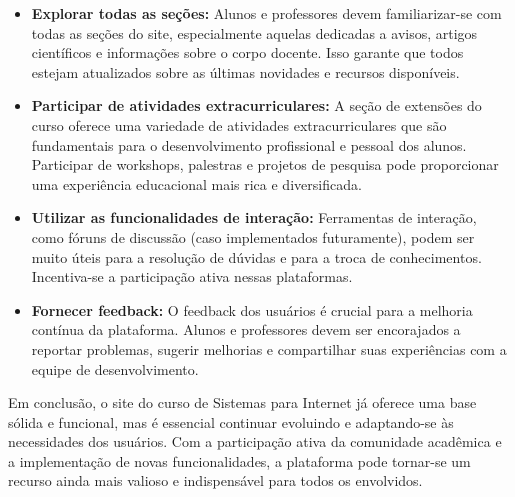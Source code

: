 \documentclass[a4paper,12pt]{report}
\begin{document}
\begin{itemize} 
    \item \textbf{Explorar todas as seções:} Alunos e professores devem familiarizar-se com todas as seções do site, especialmente aquelas dedicadas a avisos, artigos científicos e informações sobre o corpo docente. Isso garante que todos estejam atualizados sobre as últimas novidades e recursos disponíveis. 

    \item \textbf{Participar de atividades extracurriculares:} A seção de extensões do curso oferece uma variedade de atividades extracurriculares que são fundamentais para o desenvolvimento profissional e pessoal dos alunos. Participar de workshops, palestras e projetos de pesquisa pode proporcionar uma experiência educacional mais rica e diversificada. 

    \item \textbf{Utilizar as funcionalidades de interação:} Ferramentas de interação, como fóruns de discussão (caso implementados futuramente), podem ser muito úteis para a resolução de dúvidas e para a troca de conhecimentos. Incentiva-se a participação ativa nessas plataformas. 

    \item \textbf{Fornecer feedback:} O feedback dos usuários é crucial para a melhoria contínua da plataforma. Alunos e professores devem ser encorajados a reportar problemas, sugerir melhorias e compartilhar suas experiências com a equipe de desenvolvimento.

\end{itemize}
Em conclusão, o site do curso de Sistemas para Internet já oferece uma base sólida e funcional, mas é essencial continuar evoluindo e adaptando-se às necessidades dos usuários. Com a participação ativa da comunidade acadêmica e a implementação de novas funcionalidades, a plataforma pode tornar-se um recurso ainda mais valioso e indispensável para todos os envolvidos.
\end{document}
